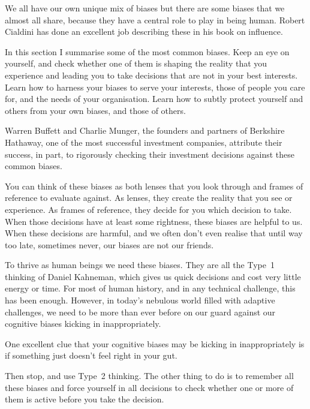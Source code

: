 We all have our own unique mix of biases but there are some biases that we almost all share, because they have a central role to play in being human. Robert Cialdini has done an excellent job describing these in his book on influence\cite{cialdini-influence}.


In this section I summarise some of the most common biases. Keep an eye on yourself, and check whether one of them is shaping the reality that you experience and leading you to take decisions that are not in your best interests. Learn how to harness your biases to serve your interests, those of people you care for, and the needs of your organisation. Learn how to subtly protect yourself and others from your own biases, and those of others.


Warren Buffett and Charlie Munger,  the founders and partners of Berkshire Hathaway,  one of the most successful investment companies, attribute their success, in part, to rigorously checking their investment decisions against these common biases.


You can think of these biases as both lenses  that you look through and frames of reference to evaluate against. As lenses, they create the reality that you see or experience. As frames of reference, they decide for you which decision to take. When those decisions have at least some rightness, these biases are helpful to us. When these decisions are harmful, and we often don't even realise that until way too late, sometimes never, our biases are not our friends.


To thrive as human beings we need these biases. They are all the Type~1 thinking of Daniel Kahneman\cite{kahneman-thinking},  which gives us quick decisions and cost very little energy or time. For most of human history, and in any technical challenge, this has been enough. However, in today's nebulous world filled with adaptive challenges, we need to be more  than ever before on our guard against our cognitive biases kicking in inappropriately.


One excellent clue that your cognitive biases may be kicking in inappropriately is if something just doesn't feel right in your gut. 


Then stop, and use Type~2 thinking. The other thing to do is to remember all these biases and force yourself in all decisions to check whether one or more of them is active before you take the decision.


